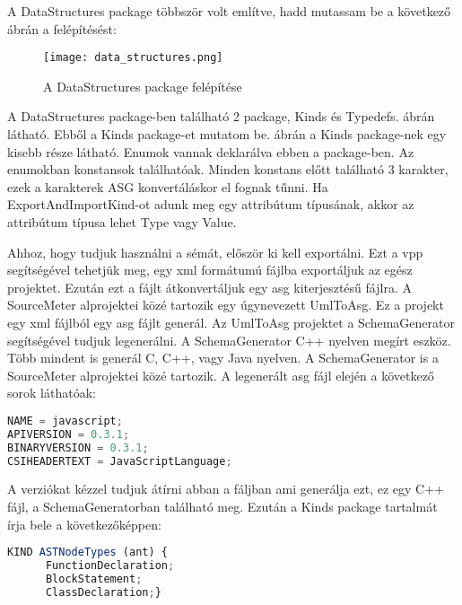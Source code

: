 \noindent

A DataStructures package többször volt említve, hadd mutassam be a következő ábrán a felépítésést:

\begin{figure}[!htbp]
      \caption{A DataStructures package felépítése}\label{fig:data_structures_kinds}
      \centering
      \texttt{[image: data\_structures.png]}
\end{figure}

A DataStructures package-ben található 2 package, Kinds és Typedefs.  ábrán látható. Ebből a Kinds package-et mutatom be.
 ábrán a Kinds package-nek egy kisebb része látható.
Enumok vannak deklarálva ebben a package-ben.
Az enumokban konstansok találhatóak. Minden konstans előtt található 3 karakter, ezek a karakterek ASG konvertáláskor el fognak tűnni.
Ha ExportAndImportKind-ot adunk meg egy attribútum típusának, akkor az attribútum típusa lehet Type vagy Value.

\noindent

Ahhoz, hogy tudjuk használni a sémát, először ki kell exportálni. Ezt a vpp segítségével tehetjük meg, egy xml formátumú fájlba exportáljuk az egész projektet.
Ezután ezt a fájlt átkonvertáljuk egy asg kiterjesztésű fájlra.
A SourceMeter alprojektei közé tartozik egy úgynevezett UmlToAsg.
Ez a projekt egy xml fájlból egy asg fájlt generál.
Az UmlToAsg projektet a SchemaGenerator segítségével tudjuk legenerálni.
A SchemaGenerator C++ nyelven megírt eszköz.
Több mindent is generál C, C++, vagy Java nyelven.
A SchemaGenerator is a SourceMeter alprojektei közé tartozik.
A legenerált asg fájl elején a következő sorok láthatóak:

\begin{lstlisting}[caption={Asg fájl első sorai},label={lst:asg_file_eleje}, language={JavaScript}]
NAME = javascript;
APIVERSION = 0.3.1;
BINARYVERSION = 0.3.1;
CSIHEADERTEXT = JavaScriptLanguage;
\end{lstlisting}

A verziókat kézzel tudjuk átírni abban a fáljban ami generálja ezt, ez egy C++ fájl, a SchemaGeneratorban található meg.
Ezután a Kinds package tartalmát írja bele a következőképpen:

\begin{lstlisting}[caption={Asg fájl kind},label={lst:asg_file_kinds}, language={JavaScript}]
KIND ASTNodeTypes (ant) {
      FunctionDeclaration;
      BlockStatement;
      ClassDeclaration;}
\end{lstlisting}

